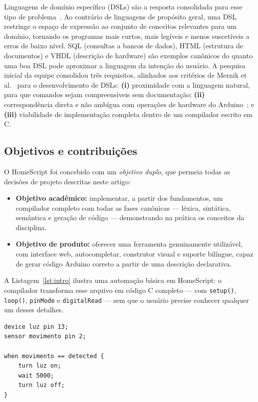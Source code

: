 \documentclass[conference]{IEEEtran}
\begin{document}
Linguagens de domínio específico (DSLs) são a resposta consolidada para
esse tipo de problema~\cite{mernik2005,fowler2010,vandeursen2000}. Ao
contrário de linguagens de propósito geral, uma DSL restringe o espaço de
expressão ao conjunto de conceitos relevantes para um domínio, tornando os
programas mais curtos, mais legíveis e menos suscetíveis a erros de baixo
nível. SQL (consultas a bancos de dados), HTML (estrutura de documentos) e
VHDL (descrição de hardware) são exemplos canônicos do quanto uma boa DSL
pode aproximar a linguagem da intenção do usuário. A pesquisa inicial da
equipe consolidou três requisitos, alinhados aos critérios de Mernik et
al.~\cite{mernik2005} para o desenvolvimento de DSLs: \textbf{(i)}
proximidade com a linguagem natural, para que comandos sejam
compreensíveis sem documentação; \textbf{(ii)} correspondência direta e
não ambígua com operações de hardware do Arduino~\cite{arduino2024}; e
\textbf{(iii)} viabilidade de implementação completa dentro de um
compilador escrito em C.

\subsection{Objetivos e contribuições}

O HomeScript foi concebido com um \emph{objetivo duplo}, que permeia todas
as decisões de projeto descritas neste artigo:

\begin{itemize}
\item \textbf{Objetivo acadêmico:} implementar, a partir dos fundamentos,
um compilador completo com todas as fases canônicas --- léxica,
sintática, semântica e geração de código --- demonstrando na prática os
conceitos da disciplina.
\item \textbf{Objetivo de produto:} oferecer uma ferramenta genuinamente
utilizável, com interface web, autocompletar, construtor visual e suporte
bilíngue, capaz de gerar código Arduino correto a partir de uma descrição
declarativa.
\end{itemize}

A Listagem~\ref{lst:intro} ilustra uma automação básica em HomeScript: o
compilador transforma esse arquivo em código C completo --- com
\texttt{setup()}, \texttt{loop()}, \texttt{pinMode} e \texttt{digitalRead}
--- sem que o usuário precise conhecer qualquer um desses detalhes.

\begin{lstlisting}[style=homescript,caption={Automação básica em HomeScript.},label={lst:intro}]
device luz pin 13;
sensor movimento pin 2;

when movimento == detected {
    turn luz on;
    wait 5000;
    turn luz off;
}
\end{lstlisting}
\end{document}
